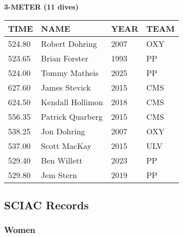 \begin{table}[H]
\centering
\begin{minipage}[t]{0.6\textwidth}
\centering
\textbf{3-METER (11 dives)}\\[0.1cm]
\begin{tabular}{@{}p{1.8cm}p{2.8cm}p{1.2cm}p{1.4cm}@{}}
\hline
    \textbf{TIME} & \textbf{NAME} & \textbf{YEAR} & \textbf{TEAM} \\
\hline
    524.80 & Robert Dohring & 2007 & OXY \\
    523.65 & Brian Forster & 1993 & PP \\
    524.00 & Tommy Matheis & 2025 & PP \\
    627.60 & James Stevick & 2015 & CMS \\
    624.50 & Kendall Hollimon & 2018 & CMS \\
    556.35 & Patrick Quarberg & 2015 & CMS \\
    538.25 & Jon Dohring & 2007 & OXY \\
    537.00 & Scott MacKay & 2015 & ULV \\
    529.40 & Ben Willett & 2023 & PP \\
    529.80 & Jem Stern & 2019 & PP \\
\hline
\end{tabular}
\end{minipage}
\end{table}


\newpage

\subsection{SCIAC Records}
\subsubsection{Women}

